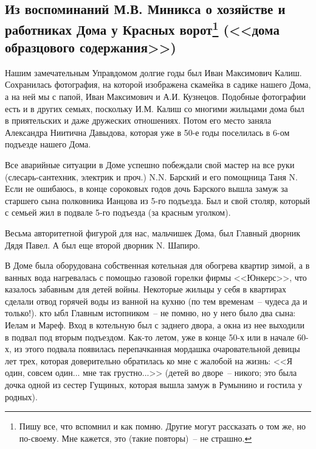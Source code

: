 \chapter{}

\section*{Из воспоминаний М.В. Миникса о хозяйстве и работниках Дома у Красных ворот\protect\footnote{Пишу все, что вспомнил и как помню. Другие могут рассказать о том же, но по-своему. Мне кажется, это (такие повторы)~-- не страшно.} (<<дома образцового содержания>>)}

Нашим замечательным Управдомом долгие годы был Иван Максимович Калиш. Сохранилась фотография, на которой изображена скамейка в садике нашего Дома, а на ней мы с папой, Иван Максимович и А.И. Кузнецов. Подобные фотографии есть и в других семьях, поскольку И.М. Калиш со многими жильцами дома был в приятельских и даже дружеских отношениях. Потом его место заняла Александра Ниитична Давыдова, которая уже в 50-е годы поселилась в 6-ом подъезде нашего Дома.

Все аварийные ситуации в Доме успешно побеждали свой мастер на все руки (слесарь-сантехник, электрик и проч.) N.N. Барский и его помощница Таня N. Если не ошибаюсь, в конце сороковых годов дочь Барского вышла замуж за старшего сына полковника Ианцова из 5-го подъезда. Был и свой столяр, который с семьей жил в подвале 5-го подъезда (за красным уголком).

Весьма авторитетной фигурой для нас, мальчишек Дома, был Главный дворник Дядя Павел. А был еще второй дворник N. Шапиро.

В Доме была оборудована собственная котельная для обогрева квартир зимой, а в ванных вода нагревалась с помощью газовой горелки фирмы <<Юнкерс>>, что казалось забавным для детей войны. Некоторые жильцы у себя в квартирах сделали отвод горячей воды из ванной на кухню (по тем временам~-- чудеса да и только!). кто ыбл Главным истопником~-- не помню, но у него было два сына: Иелам и  Мареф. Вход в котельную был с заднего двора, а окна из нее выходили в подвал под вторым подъездом. Как-то летом, уже в конце 50-х или в начале 60-х, из этого подвала появилась перепачканная мордашка очаровательной девицы лет трех, которая доверительно обратилась ко мне с жалобой на жизнь: <<Я один, совсем один... мне так грустно...>> (детей во дворе~-- никого; это была дочка одной из сестер Гущиных, которая вышла замуж в Румынино и гостила у родных).

